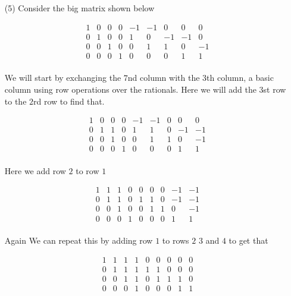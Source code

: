 \documentclass[12pt]{amsart}
\theoremstyle{definition}
\begin{document}
\begin{itemize}
\item[(5)] Consider the big matrix shown below

\[
 \boxed{\begin{matrix}
1   & 0 &   0 &   0 &   -1 &   -1 &    0 &    0 &    0\\
0   & 1 &   0 &   0 &    1 &    0 &   -1 &   -1 &    0\\
0   & 0 &   1 &   0 &    0 &    1 &    1 &    0 &   -1\\
0   & 0 &   0 &   1 &    0 &    0 &    0 &    1 &    1
\end{matrix}}
\]\\

We will start by exchanging the $7$nd column with the $3$th column, a basic column using row operations over the rationals. Here we will add the $3$st row to the $2$rd row to find that.

\[
 \boxed{\begin{matrix}
1   & 0 &   0 &   0 &   -1 &   -1 &    0 &    0 &    0\\
0   & 1 &   1 &   0 &    1 &    1 &   0  &   -1 &   -1\\
0   & 0 &   1 &   0 &    0 &    1 &    1 &    0 &   -1\\
0   & 0 &   0 &   1 &    0 &    0 &    0 &    1 &    1
\end{matrix}}
\]\\

Here we add row $2$ to row $1$ 

\[
 \boxed{\begin{matrix}
1   & 1 &   1 &   0 &    0 &    0 &    0 &   -1 &   -1\\
0   & 1 &   1 &   0 &    1 &    1 &   0  &   -1 &   -1\\
0   & 0 &   1 &   0 &    0 &    1 &    1 &    0 &   -1\\
0   & 0 &   0 &   1 &    0 &    0 &    0 &    1 &    1
\end{matrix}}
\]\\

Again We can repeat this by adding row $1$ to rows $2$ $3$ and $4$ to get that 

\[
 \boxed{\begin{matrix}
1   & 1 &   1 &   1 &    0 &    0 &    0 &    0 &    0\\
0   & 1 &   1 &   1 &    1 &    1 &   0  &    0 &    0\\
0   & 0 &   1 &   1 &    0 &    1 &    1 &    1 &    0\\
0   & 0 &   0 &   1 &    0 &    0 &    0 &    1 &    1
\end{matrix}}
\]\\


\end{itemize}
\end{document}
